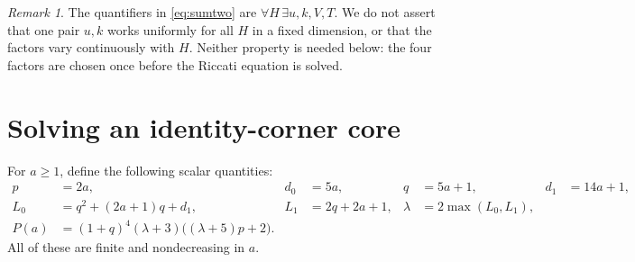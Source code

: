 \documentclass[11pt]{article}
\theoremstyle{remark}
\newtheorem{remark}[theorem]{Remark}
\numberwithin{equation}{section}
\begin{document}
\begin{remark}
The quantifiers in \eqref{eq:sumtwo} are $\forall H\,\exists u,k,V,T$. We do not
assert that one pair $u,k$ works uniformly for all $H$ in a fixed dimension, or
that the factors vary continuously with $H$. Neither property is needed below:
the four factors are chosen once before the Riccati equation is solved.
\end{remark}

\section{Solving an identity-corner core}\label{sec:riccati}
For $a\ge1$, define the following scalar quantities:
\begin{equation}\label{eq:P}
\begin{aligned}
 p&=2a,& d_0&=5a,& q&=5a+1,& d_1&=14a+1,\\
 L_0&=q^2+(2a+1)q+d_1,& L_1&=2q+2a+1,&
 \lambda&=2\max(L_0,L_1),\\[-2pt]
 P(a)&=(1+q)^4(\lambda+3)\bigl((\lambda+5)p+2\bigr).
\end{aligned}
\end{equation}
All of these are finite and nondecreasing in $a$.
\end{document}

